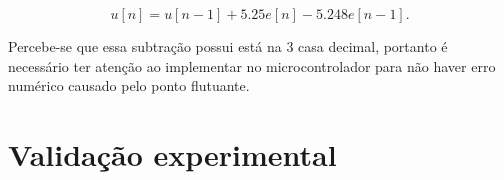 \begin{equation}
	\label{eq:12}
	u[n]=u[n-1]+5.25 e[n]-5.248 e[n-1].
\end{equation}

Percebe-se que essa subtração possui está na 3 casa decimal, portanto é necessário ter atenção ao implementar no microcontrolador para não haver erro numérico causado pelo ponto flutuante.
		\section{Validação experimental}

